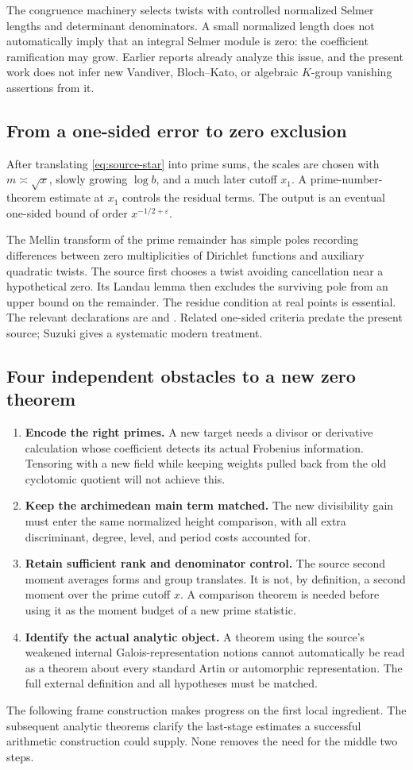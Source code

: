 The congruence machinery selects twists with controlled normalized Selmer lengths and determinant denominators. A small normalized length does not automatically imply that an integral Selmer module is zero: the coefficient ramification may grow. Earlier reports already analyze this issue, and the present work does not infer new Vandiver, Bloch--Kato, or algebraic $K$-group vanishing assertions from it.\cite{priorCollection}

\subsection{From a one-sided error to zero exclusion}

After translating \eqref{eq:source-star} into prime sums, the scales are chosen with $m\asymp\sqrt x$, slowly growing $\log b$, and a much later cutoff $x_1$. A prime-number-theorem estimate at $x_1$ controls the residual terms. The output is an eventual one-sided bound of order $x^{-1/2+\varepsilon}$.

The Mellin transform of the prime remainder has simple poles recording differences between zero multiplicities of Dirichlet functions and auxiliary quadratic twists. The source first chooses a twist avoiding cancellation near a hypothetical zero. Its Landau lemma then excludes the surviving pole from an upper bound on the remainder. The residue condition at real points is essential. The relevant declarations are
and . Related one-sided criteria predate the present source; Suzuki gives a systematic modern treatment.\cite{Suzuki}

\subsection{Four independent obstacles to a new zero theorem}

\begin{enumerate}
\item \textbf{Encode the right primes.} A new target needs a divisor or derivative calculation whose coefficient detects its actual Frobenius information. Tensoring with a new field while keeping weights pulled back from the old cyclotomic quotient will not achieve this.
\item \textbf{Keep the archimedean main term matched.} The new divisibility gain must enter the same normalized height comparison, with all extra discriminant, degree, level, and period costs accounted for.
\item \textbf{Retain sufficient rank and denominator control.} The source second moment averages forms and group translates. It is not, by definition, a second moment over the prime cutoff $x$. A comparison theorem is needed before using it as the moment budget of a new prime statistic.
\item \textbf{Identify the actual analytic object.} A theorem using the source's weakened internal Galois-representation notions cannot automatically be read as a theorem about every standard Artin or automorphic representation. The full external definition and all hypotheses must be matched.
\end{enumerate}

The following frame construction makes progress on the first local ingredient. The subsequent analytic theorems clarify the last-stage estimates a successful arithmetic construction could supply. None removes the need for the middle two steps.
